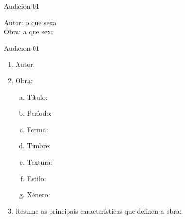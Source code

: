 \begin{defproblem}{Audicion-01}
\begin{onlysolution}
    \begin{solution}
Autor: o que sexa\\
Obra: a que sexa\\
    \end{solution}
\end{onlysolution}

\end{defproblem}
% 
\begin{defproblem}{Audicion-01}
\begin{ejercicio}[]
	\begin{enumerate}[1.-]
        \vspace*{0.3cm}
		\item
			Autor: \dotfill
			\vspace*{0.3cm}
		\item
			Obra:
			\begin{enumerate}[a)]
			    \item Título: \dotfill \vspace*{0.3cm}
			    \item Período: \dotfill \vspace*{0.3cm}
			    \item Forma: \dotfill \vspace*{0.3cm}
			    \item Timbre: \dotfill \vspace*{0.3cm} 		
			    \item Textura: \dotfill \vspace*{0.3cm}
			    \item Estilo: \dotfill \vspace*{0.3cm}
			    \item Xénero: \dotfill \vspace*{0.3cm}
			\end{enumerate}
		\item 
		    Resume as principais características que definen a obra:
			\vspace*{8.0cm}			
	\end{enumerate}
\end{ejercicio}


\end{defproblem}
